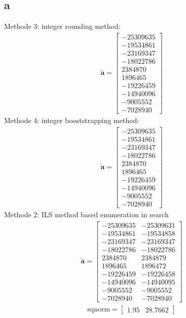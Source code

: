 \documentclass[12pt
,headinclude
,headsepline
,bibtotocnumbered
]{scrartcl}
\begin{document}
\subsection{a}
Methode 3: integer rounding method:
\begin{align*}
\check{\boldsymbol{a}}=\begin{bmatrix}
	-25309635\\-19534861\\-23169347\\-18022786\\2384870\\1896465\\-19226459\\-14940096\\-9005552\\-7028940
\end{bmatrix}
\end{align*}
Methode 4: integer booststrapping method:
\begin{align*}
	\check{\boldsymbol{a}}=\begin{bmatrix}
		-25309635\\-19534861\\-23169347\\-18022786\\2384870\\1896465\\-19226459\\-14940096\\-9005552\\-7028940
	\end{bmatrix}
\end{align*}
Methode 2: ILS method based enumeration in search
\begin{align*}
	\check{\boldsymbol{a}}=\begin{bmatrix}
		-25309635&-25309631\\-19534861&-19534858\\-23169347&-23169347\\-18022786&-18022786\\2384870&2384879\\1896465&1896472\\-19226459&-19226458\\-14940096&-14940095\\-9005552&-9005552\\-7028940&-7028940
	\end{bmatrix}
\end{align*}\begin{align*}
 \text{sqnorm}=\begin{bmatrix}
 	1.95&28.7662
 \end{bmatrix}
\end{align*}
\end{document}
